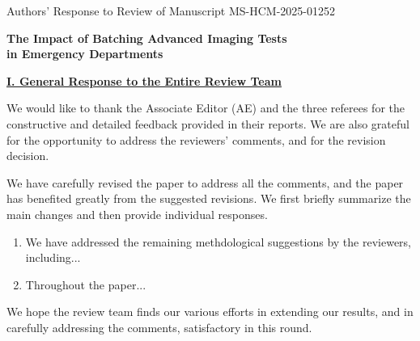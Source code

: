 \documentclass[11pt]{article}
\newcommand{\1}{\hbox{\rm 1\kern-.35em 1}}
\begin{document}
\setlength{\parindent}{0pt}
\pagestyle{fancy}
\fancyhead{}
\renewcommand{\headrulewidth}{0.0pt}

\begin{center}
{Authors' Response to Review of Manuscript MS-HCM-2025-01252}

\vspace{1mm}
\Large
\textbf{The Impact of Batching Advanced Imaging Tests\\ in Emergency Departments}
\vspace{1mm}

\end{center}
 \normalsize
\baselineskip=16pt
\noindent\underline{\textbf{I. General Response to the Entire Review Team}}



\noindent We would like to thank the Associate Editor (AE) and the three referees for the constructive and detailed feedback provided in their reports. We are also grateful for the opportunity to address the reviewers' comments, and for the revision decision.

We have carefully revised the paper to address all the comments, and the paper has benefited greatly from the suggested revisions. We first briefly summarize the main changes and then provide individual responses.

\begin{enumerate}
\item We have addressed the remaining methdological suggestions by the reviewers, including...
\item Throughout the paper...
\end{enumerate}


We hope the review team finds our various efforts in extending our results, and in carefully addressing the comments, satisfactory in this round.









\clearpage
\end{document}
